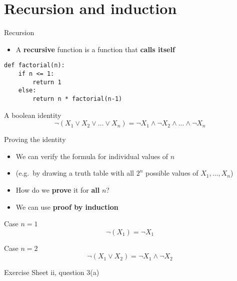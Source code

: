 \part{Recursion and induction}
\frame{\partpage}

\begin{frame}[fragile]{Recursion}
    \begin{itemize}
        \pause\item A \textbf{recursive} function is a function that \textbf{calls itself}
    \end{itemize}
    \pause
    \begin{lstlisting}
def factorial(n):
    if n <= 1:
        return 1
    else:
        return n * factorial(n-1)
    \end{lstlisting}
\end{frame}

\begin{frame}{A boolean identity}
    $$ \neg (X_1 \vee X_2 \vee \dots \vee X_n) = \neg X_1 \wedge \neg X_2 \wedge \dots \wedge \neg X_n $$
\end{frame}

\begin{frame}{Proving the identity}
    \begin{itemize}
        \pause\item We can verify the formula for individual values of $n$
        \pause\item (e.g.\ by drawing a truth table with all $2^n$ possible values of $X_1, \dots, X_n$)
        \pause\item How do we \textbf{prove} it for \textbf{all} $n$?
        \pause\item We can use \textbf{proof by induction}
    \end{itemize}
\end{frame}

\begin{frame}{Case $n=1$}
    $$ \neg (X_1) = \neg X_1 $$
\end{frame}

\begin{frame}{Case $n=2$}
    $$ \neg (X_1 \vee X_2) = \neg X_1 \wedge \neg X_2 $$
    \pause
    \begin{center}
        Exercise Sheet ii, question 3(a)
    \end{center}
\end{frame}

